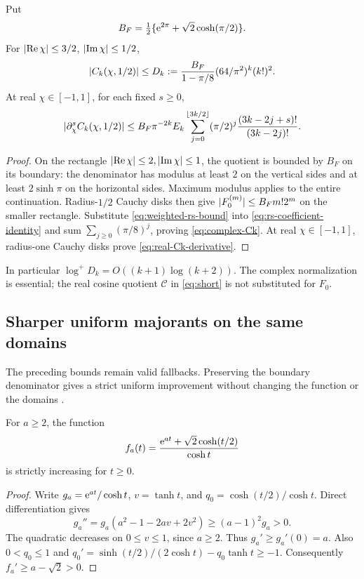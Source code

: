 \begin{proposition}
\label{prop:rs-complex}
Put
\[
 B_F=\tfrac12\{\mathrm e^{2\pi}+\sqrt2\cosh(\pi/2)\}.
\]
For \(\lvert \operatorname{Re}\chi\rvert\le3/2\), \(\lvert \operatorname{Im}\chi\rvert\le1/2\),
\begin{equation}
 \lvert C_k(\chi,1/2)\rvert\le
 D_k:=\frac{B_F}{1-\pi/8}
                   (64/\pi^2)^k(k!)^2.
 \label{eq:complex-Ck}
\end{equation}
At real \(\chi\in[-1,1]\), for each fixed \(s\ge0\),
\begin{equation}
 \lvert \partial_\chi^sC_k(\chi,1/2)\rvert
 \le B_F\pi^{-2k}E_k
       \sum_{j=0}^{\lfloor3k/2\rfloor}
       (\pi/2)^j\frac{(3k-2j+s)!}{(3k-2j)!}.
 \label{eq:real-Ck-derivative}
\end{equation}
\end{proposition}
\begin{proof}
On the rectangle \(\lvert \operatorname{Re}\chi\rvert\le2,\lvert \operatorname{Im}\chi\rvert\le1\),
the quotient is bounded by \(B_F\) on its boundary:
the denominator has modulus at least \(2\) on the vertical
sides and at least \(2\sinh\pi\) on the horizontal sides.
Maximum modulus applies to the entire continuation.
Radius-\(1/2\) Cauchy disks then give
\(\lvert F_0^{(m)}\rvert\le B_Fm!2^m\) on the smaller rectangle.
Substitute \eqref{eq:weighted-rs-bound} into
\eqref{eq:rs-coefficient-identity} and sum
\(\sum_{j\ge0}(\pi/8)^j\), proving \eqref{eq:complex-Ck}.
At real \(\chi\in[-1,1]\), radius-one Cauchy disks prove
\eqref{eq:real-Ck-derivative}.
\end{proof}
In particular \(\log^+D_k=O((k+1)\log(k+2))\).
The complex normalization is essential; the real cosine quotient
\(\mathcal C\) in \eqref{eq:short} is not substituted for \(F_0\).

\subsection{Sharper uniform majorants on the same domains}
\label{subsec:sharper-rs}
The preceding bounds remain valid fallbacks. Preserving the boundary
denominator gives a strict uniform improvement without changing the
function or the domains \cite{rec18}.

\begin{lemma}\label{lem:rs-boundary}
For \(a\ge2\), the function
\[
 f_a(t)=\frac{\mathrm e^{at}+\sqrt2\cosh(t/2)}{\cosh t}
\]
is strictly increasing for \(t\ge0\).
\end{lemma}
\begin{proof}
Write \(g_a=\mathrm e^{at}/\cosh t\), \(v=\tanh t\), and
\(q_0=\cosh(t/2)/\cosh t\). Direct differentiation gives
\[
 g_a''=g_a(a^2-1-2av+2v^2)\ge(a-1)^2g_a>0.
\]
The quadratic decreases on \(0\le v\le1\), since \(a\ge2\).
Thus \(g_a'\ge g_a'(0)=a\). Also \(0<q_0\le1\) and
\(q_0'=\sinh(t/2)/(2\cosh t)-q_0\tanh t\ge-1\).
Consequently \(f_a'\ge a-\sqrt2>0\).
\end{proof}

